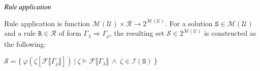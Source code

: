 \documentclass{elsarticle}
\begin{document}












\begin{definition} \label{app}
$\emph{Rule application}$ 

\noindent Rule application is function $\mathscr{M}(\mathcal{U}) \times \mathcal{R} \rightarrow 2^{\mathscr{M}(\mathcal{U})}$. For a solution $\mathtt{S} \in \mathscr{M}(\mathcal{U})$ and a rule $\mathtt{R} \in \mathcal{R}$ of form $\Gamma_\lambda \Rightarrow \Gamma_\rho$, the resulting set $\mathcal{S} \in 2^{\mathscr{M}(\mathcal{U})}$ is constructed as the following:

\begin{center}
$\mathcal{S} = \{~ \varphi(\zeta[\mathcal{F} \llbracket \Gamma_\rho \rrbracket ]) ~|~ \zeta \models \mathcal{F} \llbracket \Gamma_\lambda \rrbracket ~\wedge~ \zeta \in \mathcal{I}(\mathtt{S}) ~\}$
\end{center}

\end{definition}
\end{document}
